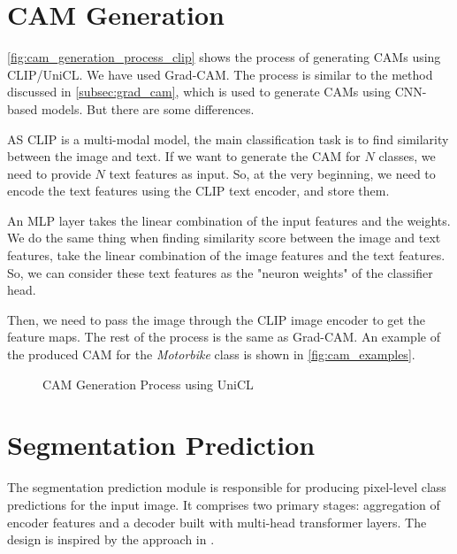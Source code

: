 \section{CAM Generation}
\label{sec:cam_generation}

\autoref{fig:cam_generation_process_clip} shows the process of generating CAMs using CLIP/UniCL. We have used Grad-CAM. The process is similar to the method discussed in \autoref{subsec:grad_cam}, which is used to generate CAMs using CNN-based models.
 But there are some differences.

AS CLIP is a multi-modal model, the main classification task is to find similarity between the image and text. If we want to generate the CAM for $N$ classes, we need to provide $N$ text features as input. So, at the very beginning, we need to encode the text features using the CLIP text encoder, and store them.

An MLP layer takes the linear combination of the input features and the weights. We do the same thing when finding similarity score between the image and text features, take the linear combination of the image features and the text features. So, we can consider these text features as the "neuron weights" of the classifier head.

Then, we need to pass the image through the CLIP image encoder to get the feature maps. The rest of the process is the same as Grad-CAM. An example of the produced CAM for the \textit{Motorbike} class is shown in \autoref{fig:cam_examples}.


\begin{figure}[htbp]
    \centering
    \caption{CAM Generation Process using UniCL}
    \label{fig:cam_generation_process_clip}
\end{figure}

\section{Segmentation Prediction}
\label{sec:segmentation_prediction}
The segmentation prediction module is responsible for producing pixel-level class predictions for the input image. It comprises two primary stages: aggregation of encoder features and a decoder built with multi-head transformer layers. The design is inspired by the approach in \cite{wsss_frozen_clip}.

